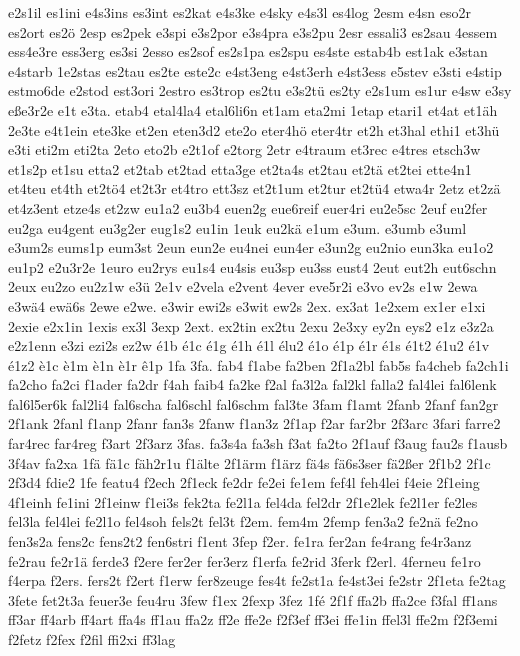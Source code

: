 {e2s1il
es1ini
e4s3ins
es3int
es2kat
e4s3ke
e4sky
e4s3l
es4log
2esm
e4sn
eso2r
es2ort
es2ö
2esp
es2pek
e3spi
e3s2por
e3s4pra
e3s2pu
2esr
essali3
es2sau
4essem
ess4e3re
ess3erg
es3si
2esso
es2sof
es2s1pa
es2spu
es4ste
estab4b
est1ak
e3stan
e4starb
1e2stas
es2tau
es2te
este2c
e4st3eng
e4st3erh
e4st3ess
e5stev
e3sti
e4stip
estmo6de
e2stod
est3ori
2estro
es3trop
es2tu
e3s2tü
es2ty
e2s1um
es1ur
e4sw
e3sy
eße3r2e
e1t
e3ta.
etab4
etal4la4
etal6li6n
et1am
eta2mi
1etap
etari1
et4at
et1äh
2e3te
e4t1ein
ete3ke
et2en
eten3d2
ete2o
eter4hö
eter4tr
et2h
et3hal
ethi1
et3hü
e3ti
eti2m
eti2ta
2eto
eto2b
e2t1of
e2torg
2etr
e4traum
et3rec
e4tres
etsch3w
et1s2p
et1su
etta2
et2tab
et2tad
etta3ge
et2ta4s
et2tau
et2tä
et2tei
ette4n1
et4teu
et4th
et2tö4
et2t3r
et4tro
ett3sz
et2t1um
et2tur
et2tü4
etwa4r
2etz
et2zä
et4z3ent
etze4s
et2zw
eu1a2
eu3b4
euen2g
eue6reif
euer4ri
eu2e5sc
2euf
eu2fer
eu2ga
eu4gent
eu3g2er
eug1s2
eu1in
1euk
eu2kä
e1um
e3um.
e3umb
e3uml
e3um2s
eums1p
eum3st
2eun
eun2e
eu4nei
eun4er
e3un2g
eu2nio
eun3ka
eu1o2
eu1p2
e2u3r2e
1euro
eu2rys
eu1s4
eu4sis
eu3sp
eu3ss
eust4
2eut
eut2h
eut6schn
2eux
eu2zo
eu2z1w
e3ü
2e1v
e2vela
e2vent
4ever
eve5r2i
e3vo
ev2s
e1w
2ewa
e3wä4
ewä6s
2ewe
e2we.
e3wir
ewi2s
e3wit
ew2s
2ex.
ex3at
1e2xem
ex1er
e1xi
2exie
e2x1in
1exis
ex3l
3exp
2ext.
ex2tin
ex2tu
2exu
2e3xy
ey2n
eys2
e1z
e3z2a
e2z1enn
e3zi
ezi2s
ez2w
é1b
é1c
é1g
é1h
é1l
élu2
é1o
é1p
é1r
é1s
é1t2
é1u2
é1v
é1z2
è1c
è1m
è1n
è1r
ê1p
1fa
3fa.
fab4
f1abe
fa2ben
2f1a2bl
fab5s
fa4cheb
fa2ch1i
fa2cho
fa2ci
f1ader
fa2dr
f4ah
faib4
fa2ke
f2al
fa3l2a
fal2kl
falla2
fal4lei
fal6lenk
fal6l5er6k
fal2li4
fal6scha
fal6schl
fal6schm
fal3te
3fam
f1amt
2fanb
2fanf
fan2gr
2f1ank
2fanl
f1anp
2fanr
fan3s
2fanw
f1an3z
2f1ap
f2ar
far2br
2f3arc
3fari
farre2
far4rec
far4reg
f3art
2f3arz
3fas.
fa3s4a
fa3sh
f3at
fa2to
2f1auf
f3aug
fau2s
f1ausb
3f4av
fa2xa
1fä
fä1c
fäh2r1u
f1älte
2f1ärm
f1ärz
fä4s
fä6s3ser
fä2ßer
2f1b2
2f1c
2f3d4
fdie2
1fe
featu4
f2ech
2f1eck
fe2dr
fe2ei
fe1em
fef4l
feh4lei
f4eie
2f1eing
4f1einh
fe1ini
2f1einw
f1ei3s
fek2ta
fe2l1a
fel4da
fel2dr
2f1e2lek
fe2l1er
fe2les
fel3la
fel4lei
fe2l1o
fel4soh
fels2t
fel3t
f2em.
fem4m
2femp
fen3a2
fe2nä
fe2no
fen3s2a
fens2c
fens2t2
fen6stri
f1ent
3fep
f2er.
fe1ra
fer2an
fe4rang
fe4r3anz
fe2rau
fe2r1ä
ferde3
f2ere
fer2er
fer3erz
f1erfa
fe2rid
3ferk
f2erl.
4ferneu
fe1ro
f4erpa
f2ers.
fers2t
f2ert
f1erw
fer8zeuge
fes4t
fe2st1a
fe4st3ei
fe2str
2f1eta
fe2tag
3fete
fet2t3a
feuer3e
feu4ru
3few
f1ex
2fexp
3fez
1fé
2f1f
ffa2b
ffa2ce
f3fal
ff1ans
ff3ar
ff4arb
ff4art
ffa4s
ff1au
ffa2z
ff2e
ffe2e
f2f3ef
ff3ei
ffe1in
ffel3l
ffe2m
f2f3emi
f2fetz
f2fex
f2fil
ffi2xi
ff3lag
}
